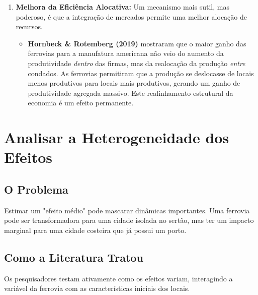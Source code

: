 \documentclass[12pt, a4paper]{article}
\begin{document}
\begin{enumerate}[label=\arabic*.]
    \item \textbf{Melhora da Eficiência Alocativa:} Um mecanismo mais sutil, mas poderoso, é que a integração de mercados permite uma melhor alocação de recursos.
    \begin{itemize}
        \item  \textbf{Hornbeck \& Rotemberg (2019)} mostraram que o maior ganho das ferrovias para a manufatura americana não veio do aumento da produtividade \textit{dentro} das firmas, mas da realocação da produção \textit{entre} condados. As ferrovias permitiram que a produção se deslocasse de locais menos produtivos para locais mais produtivos, gerando um ganho de produtividade agregada massivo. Este realinhamento estrutural da economia é um efeito permanente.
    \end{itemize}
\end{enumerate}

\section{Analisar a Heterogeneidade dos Efeitos}

\subsection{O Problema}

Estimar um "efeito médio" pode mascarar dinâmicas importantes. Uma ferrovia pode ser transformadora para uma cidade isolada no sertão, mas ter um impacto marginal para uma cidade costeira que já possui um porto.

\subsection{Como a Literatura Tratou}

Os pesquisadores testam ativamente como os efeitos variam, interagindo a variável da ferrovia com as características iniciais dos locais.
\end{document}
